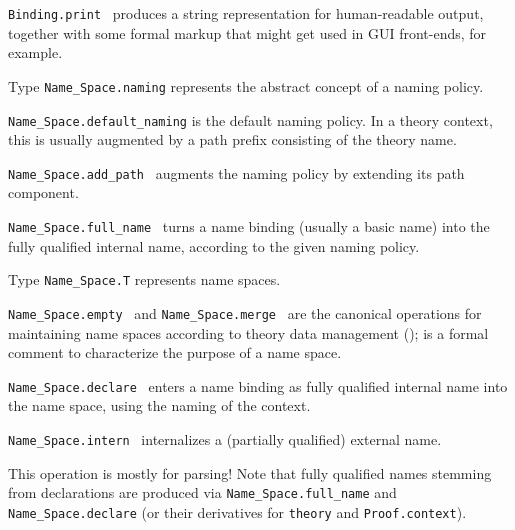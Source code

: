 \begin{isabellebody}
\begin{isamarkuptext}
\begin{description}
  \item \verb|Binding.print|~ produces a string
  representation for human-readable output, together with some formal
  markup that might get used in GUI front-ends, for example.

  \item Type \verb|Name_Space.naming| represents the abstract
  concept of a naming policy.

  \item \verb|Name_Space.default_naming| is the default naming policy.
  In a theory context, this is usually augmented by a path prefix
  consisting of the theory name.

  \item \verb|Name_Space.add_path|~ augments the
  naming policy by extending its path component.

  \item \verb|Name_Space.full_name|~ turns a
  name binding (usually a basic name) into the fully qualified
  internal name, according to the given naming policy.

  \item Type \verb|Name_Space.T| represents name spaces.

  \item \verb|Name_Space.empty|~ and \verb|Name_Space.merge|~ are the canonical operations for
  maintaining name spaces according to theory data management
  ();  is a formal comment
  to characterize the purpose of a name space.

  \item \verb|Name_Space.declare|~ enters a name binding as fully qualified internal name into
  the name space, using the naming of the context.

  \item \verb|Name_Space.intern|~ internalizes a
  (partially qualified) external name.

  This operation is mostly for parsing!  Note that fully qualified
  names stemming from declarations are produced via \verb|Name_Space.full_name| and \verb|Name_Space.declare|
  (or their derivatives for \verb|theory| and
  \verb|Proof.context|).


\end{description}
\end{isamarkuptext}
\end{isabellebody}
